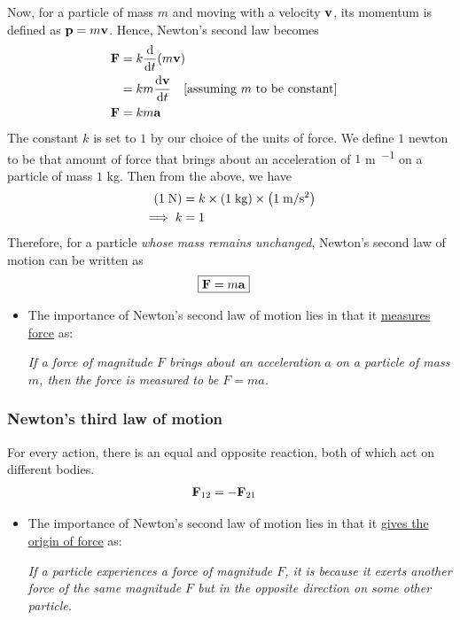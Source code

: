 	    	Now, for a particle of mass $m$ and moving with a velocity $\vb{v}$, its momentum is defined as $\vb{p}=m\vb{v}$. Hence, Newton's second law becomes
	    	\begin{align*}
	    		\vb{F}&=k\dv{t}\qty(m\vb{v}) \\
	    			&=km\dv{\vb{v}}{t}\qq{[assuming $m$ to be constant]} \\
	    		\vb{F}&=km\vb{a}
	    	\end{align*}
	    	The constant $k$ is set to $1$ by our choice of the units of force. We define $1$ newton to be that amount of force that brings about an acceleration of $1$ \unit{\metre\per{\second\squared}} on a particle of mass $1$ \unit{\kilo\gram}. Then from the above, we have
	    	\begin{align*}
	    		\qty(1\;\unit{\newton})&=k\times\qty(1\;\unit{\kilo\gram})\times\qty(1\;\unit{\metre\per{\second\squared}}) \\
	    		\implies k&=1
	    	\end{align*}
	    	Therefore, for a particle \emph{whose mass remains unchanged}, Newton's second law of motion can be written as
	    	\begin{align*}
	    		\Aboxed{\vb{F}&=m\vb{a}}
	    	\end{align*}
	    	
	    	\begin{itemize}
	    	\item The importance of Newton's second law of motion lies in that it \ul{measures force} as:
	    	
	    	\emph{If a force of magnitude $F$ brings about an acceleration $a$ on a particle of mass $m$, then the force is measured to be $F=ma$.}
	    	\end{itemize}
	    
	    \subsubsection{Newton's third law of motion}
	    	\begin{tcolorbox}[colframe=black, colback=lightgray, opacityfill=0.2, arc=0mm]
	    		For every action, there is an equal and opposite reaction, both of which act on different bodies.
	    		\begin{align*}
	    			\vb{F}_{12}&=-\vb{F}_{21}
	    		\end{align*}
	    	\end{tcolorbox}\vspace{-2.5ex}
	    	\begin{itemize}
	    	\item The importance of Newton's second law of motion lies in that it \ul{gives the origin of force} as:
	    	
	    	\emph{If a particle experiences a force of magnitude $F$, it is because it exerts another force of the same magnitude $F$ but in the opposite direction on some other particle.}
	    	\end{itemize}
	    	
